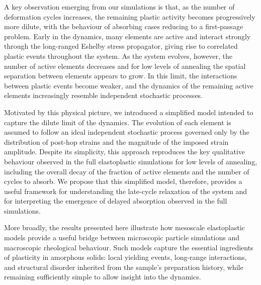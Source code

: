 \documentclass[asymmetricmargins]{library/duthesis}%
\begin{document}
A key observation emerging from our simulations is that, as the number of deformation cycles increases, the remaining plastic activity becomes progressively more dilute, with the behaviour of absorbing cases reducing to a first-passage problem. Early in the dynamics, many elements are active and interact strongly through the long-ranged Eshelby stress propagator, giving rise to correlated plastic events throughout the system. As the system evolves, however, the number of active elements decreases and for low levels of annealing the spatial separation between elements appears to grow. In this limit, the interactions between plastic events become weaker, and the dynamics of the remaining active elements increasingly resemble independent stochastic processes.

Motivated by this physical picture, we introduced a simplified model intended to capture the dilute limit of the dynamics. The evolution of each element is assumed to follow an ideal independent stochastic process governed only by the distribution of post-hop strains and the magnitude of the imposed strain amplitude. Despite its simplicity, this approach reproduces the key qualitative behaviour observed in the full elastoplastic simulations for low levels of annealing, including the overall decay of the fraction of active elements and the number of cycles to absorb. We propose that this simplified model, therefore, provides a useful framework for understanding the late-cycle relaxation of the system and for interpreting the emergence of delayed absorption observed in the full simulations.

More broadly, the results presented here illustrate how mesoscale elastoplastic models provide a useful bridge between microscopic particle simulations and macroscopic rheological behaviour. Such models capture the essential ingredients of plasticity in amorphous solids: local yielding events, long-range interactions, and structural disorder inherited from the sample's preparation history, while remaining sufficiently simple to allow insight into the dynamics.

\end{document}
